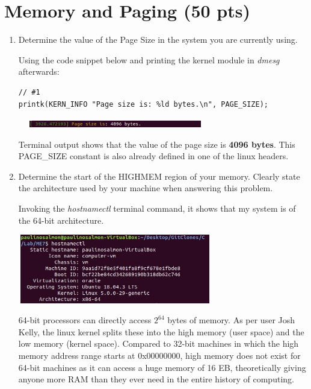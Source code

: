 \documentclass[conference]{IEEEtran}
\newcommand\tab[1][0.5cm]{\hspace*{#1}}
\begin{document}
\section{Memory and Paging (50 pts)}
\begin{enumerate}
\item Determine the value of the Page Size in the system you are currently using. 

\tab Using the code snippet below and printing the kernel module in \textit{dmesg} afterwards:
\begin{lstlisting}
// #1
printk(KERN_INFO "Page size is: %ld bytes.\n", PAGE_SIZE);
\end{lstlisting}
\begin{center}
	\includegraphics[width=8.5cm, height=0.3cm]{memory5.jpg}
\end{center}
\tab Terminal output shows that the value of the page size is \textbf{4096 bytes}. This PAGE\_SIZE constant is also already defined in one of the linux headers. \\


\item Determine the start of the HIGHMEM region of your memory. Clearly state the
architecture used by your machine when answering this problem. 

\tab Invoking the \textit{hostnamectl} terminal command, it shows that my system is of the 64-bit architecture.

\begin{center}
	\includegraphics[width=8.5cm, height=3cm]{memory6.jpg}
\end{center}

\tab 64-bit processors can directly access $2^{64}$ bytes of memory. As per user Josh Kelly, the linux kernel splits these into the high memory (user space) and the low memory (kernel space). Compared to 32-bit machines in which the high memory address range starts at 0x00000000, high memory does not exist for 64-bit machines as it can access a huge memory of 16 EB, theoretically giving anyone more RAM than they ever need in the entire history of computing. \\


\end{enumerate}
\end{document}
